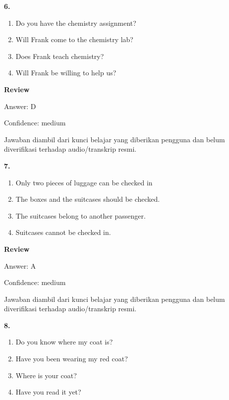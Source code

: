 \documentclass[12pt]{article}
\begin{document}
\vspace{0.25\baselineskip}
\noindent\textbf{6.}
\begin{enumerate}[label=(\Alph*),leftmargin=*,itemsep=0.2em]
\item Do you have the chemistry assignment?
\item Will Frank come to the chemistry lab?
\item Does Frank teach chemistry?
\item Will Frank be willing to help us?
\end{enumerate}
\par
\begingroup
\setlength{\parskip}{0pt}
\setlength{\parindent}{0pt}
\textbf{Review}\par
Answer: D\par
Confidence: medium\par
Jawaban diambil dari kunci belajar yang diberikan pengguna dan belum diverifikasi terhadap audio/transkrip resmi.\par
\endgroup
\par
\vspace{0.25\baselineskip}
\noindent\textbf{7.}
\begin{enumerate}[label=(\Alph*),leftmargin=*,itemsep=0.2em]
\item Only two pieces of luggage can be checked in
\item The boxes and the suitcases should be checked.
\item The suitcases belong to another passenger.
\item Suitcases cannot be checked in.
\end{enumerate}
\par
\begingroup
\setlength{\parskip}{0pt}
\setlength{\parindent}{0pt}
\textbf{Review}\par
Answer: A\par
Confidence: medium\par
Jawaban diambil dari kunci belajar yang diberikan pengguna dan belum diverifikasi terhadap audio/transkrip resmi.\par
\endgroup
\par
\vspace{0.25\baselineskip}
\noindent\textbf{8.}
\begin{enumerate}[label=(\Alph*),leftmargin=*,itemsep=0.2em]
\item Do you know where my coat is?
\item Have you been wearing my red coat?
\item Where is your coat?
\item Have you read it yet?
\end{enumerate}
\end{document}

